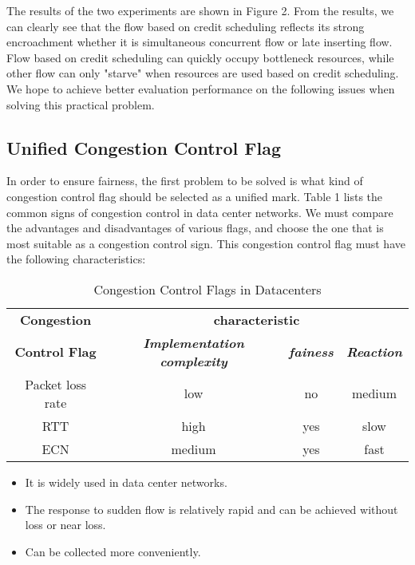 \documentclass[conference]{IEEEtran}
\begin{document}
\indent The results of the two experiments are shown in Figure 2. From the results, we can clearly see that the flow based on credit scheduling reflects its strong encroachment whether it is simultaneous concurrent flow or late inserting flow. Flow based on credit scheduling can quickly occupy bottleneck resources, while other flow can only "starve" when resources are used based on credit scheduling. We hope to achieve better evaluation performance on the following issues when solving this practical problem.

\subsection{Unified Congestion Control Flag}



In order to ensure fairness, the first problem to be solved is what kind of congestion control flag should be selected as a unified mark. Table 1 lists the common signs of congestion control in data center networks. We must compare the advantages and disadvantages of various flags, and choose the one that is most suitable as a congestion control sign. This congestion control flag must have the following characteristics:
\begin{table}[!t]
\caption{Congestion Control Flags in Datacenters }
\begin{center}
\begin{tabular}{|c|c|c|c|}
\hline
\textbf{Congestion }&\multicolumn{3}{|c|}{\textbf{characteristic}} \\
\cline{2-4}
\textbf{Control Flag} & \textbf{\textit{Implementation complexity}}& \textbf{\textit{ fainess}} & \textbf{\textit{Reaction}}\\
\hline
Packet loss rate& low & no& medium \\
\hline
RTT& high&  yes& slow \\
\hline
ECN& medium&  yes& fast \\
\hline
\end{tabular}
\label{tab1}
\end{center}
\end{table}

\begin{itemize}

\item It is widely used in data center networks.

\item The response to sudden flow is relatively rapid and can be achieved without loss or near loss.

\item Can be collected more conveniently.

\end{itemize}
\end{document}
